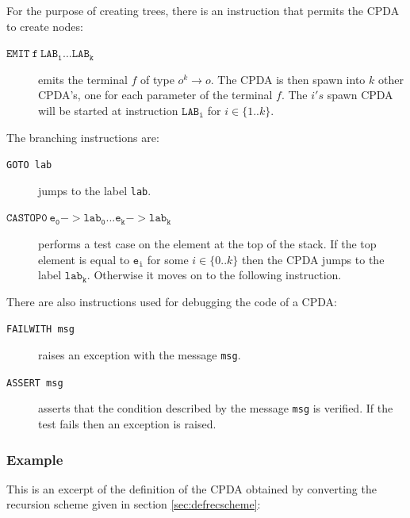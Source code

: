 \documentclass{article}
\begin{document}
For the purpose of creating trees, there is an instruction that permits the CPDA to
create nodes:
\begin{description}
  \item[$\mathtt{EMIT\ f\ LAB_1 \ldots LAB_k}$] emits the terminal $f$ of type $o^k \rightarrow o$.
   The CPDA is then spawn into $k$ other CPDA's, one for each parameter of the terminal $f$.
   The $i's$ spawn CPDA will be started at instruction $\mathtt{LAB_i}$ for $i \in \{1..k\}$.
\end{description}

The branching instructions are:
\begin{description}
  \item[{\tt GOTO lab}] jumps to the label {\tt lab}.
  \item[$\mathtt{CASTOP0\ e_0->lab_0 ... e_k->lab_k}$] performs a test case on the element
  at the top of the stack. If the top element is equal to $\mathtt{e_i}$ for some $i \in \{0..k\}$
  then the CPDA jumps to the label $\mathtt{lab_k}$. Otherwise it moves on to the following instruction.
\end{description}

There are also instructions used for debugging the code of a CPDA:
\begin{description}
  \item[{\tt FAILWITH msg}] raises an exception with the message {\tt msg}.
  \item[{\tt ASSERT msg}] asserts that the condition described by the message {\tt msg} is verified. If the test fails then an exception is raised.
\end{description}

\subsubsection{Example}

This is an excerpt of the definition of the CPDA obtained by converting the recursion scheme given in section \ref{sec:defrecscheme}:
\end{document}
